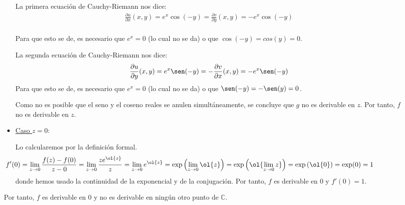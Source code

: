 \documentclass[12pt]{article}
\begin{document}
\begin{ejercicio}[3 puntos]
\begin{description}
\begin{itemize}
            La primera ecuación de Cauchy-Riemann nos dice:
            \begin{align*}
                \frac{\partial u}{\partial x}(x,y) = e^x\cos(-y)
                = \frac{\partial v}{\partial y}(x,y) = -e^x\cos(-y)\\
            \end{align*}

            Para que esto se de, es necesario que $e^x=0$ (lo cual no se da) o que $\cos(-y)=cos(y)=0$.

            La segunda ecuación de Cauchy-Riemann nos dice:
            \begin{align*}
                \frac{\partial u}{\partial y}(x,y) = e^x\sen(-y)
                = -\frac{\partial v}{\partial x}(x,y) = -e^x\sen(-y)\\
            \end{align*}
            Para que esto se de, es necesario que $e^x=0$ (lo cual no se da) o que $\sen(-y)=-\sen(y)=0$.

            Como no es posible que el seno y el coseno reales se anulen simultáneamente, se concluye que $g$ no es derivable en $z$. Por tanto, $f$ no es derivable en $z$.

            \item{ \ul{Caso $z=0$}:}
            
            Lo calcularemos por la definición formal.
            \begin{equation*}
                \hspace{-2cm}f'(0) = \lim_{z\to 0} \frac{f(z)-f(0)}{z-0} = \lim_{z\to 0} \frac{z e^{\ol{z}}}{z} = \lim_{z\to 0} e^{\ol{z}} = \exp\left(\lim_{z\to 0} \ol{z}\right) = \exp\left(\ol{\lim_{z\to 0} z}\right) = \exp\left(\ol{0}\right) = \exp(0) = 1
            \end{equation*}
            donde hemos usado la continuidad de la exponencial y de la conjugación. Por tanto, $f$ es derivable en $0$ y $f'(0)=1$.
        \end{itemize}
        
        Por tanto, $f$ es derivable en $0$ y no es derivable en ningún otro punto de $\mathbb{C}$.        
        \end{description}
    \end{ejercicio}
\end{document}
